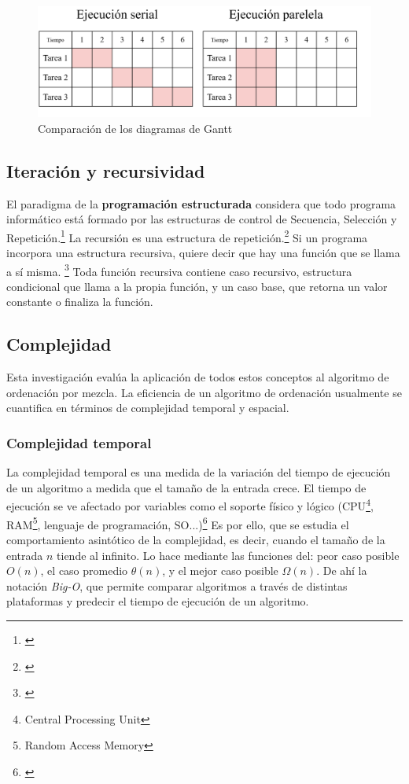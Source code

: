\documentclass[titlepage]{article}
\begin{document}

\begin{figure}
    \centering
    \captionsetup{justification=centering}
    \includegraphics[width=0.65\linewidth]{Diagrames/serialVsParallel.png}
    \caption{Comparación de los diagramas de Gantt}
    \label{fig:serialVsParallel}
\end{figure}

\subsection{Iteración y recursividad} %
El paradigma de la \textbf{programación estructurada} considera que todo programa informático está formado por las estructuras de control de Secuencia, Selección y Repetición.\footnote{\cite{extended-learning-institute-no-date}} La recursión es una estructura de repetición.\footnote{\cite{wellesley-college-2000}} Si un programa incorpora una estructura recursiva, quiere decir que hay una función que se llama a sí misma. \footnote{\cite{bhargava-2016}} Toda función recursiva contiene caso recursivo, estructura condicional que llama a la propia función, y un caso base,  que retorna un valor constante o finaliza la función. 

\subsection{Complejidad} %
Esta investigación evalúa la aplicación de todos estos conceptos al algoritmo de ordenación por mezcla. La eficiencia de un algoritmo de ordenación usualmente se cuantifica en términos de complejidad temporal y espacial.

\subsubsection{Complejidad temporal}
La complejidad temporal es una medida de la variación del tiempo de ejecución de un algoritmo a medida que el tamaño de la entrada crece. El tiempo de ejecución se ve afectado por variables como el soporte físico y lógico (CPU\footnote{Central Processing Unit}, RAM\footnote{Random Access Memory}, lenguaje de programación, SO...)\footnote{\cite{Heineman2008-mw}} Es por ello, que se estudia el comportamiento asintótico de la complejidad, es decir, cuando el tamaño de la entrada $n$ tiende al infinito. Lo hace mediante las funciones del: peor caso posible \(O(n)\), el caso promedio \(\theta(n)\), y el mejor caso posible \(\Omega(n)\). \footnotemark[8] De ahí la notación \textit{Big-O}, que permite comparar algoritmos a través de distintas plataformas y predecir el tiempo de ejecución de un algoritmo.
\end{document}
